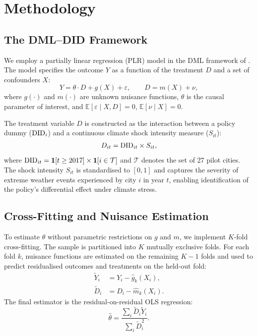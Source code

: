 \section{Methodology}
\label{sec:methodology}

\subsection{The DML--DID Framework}

We employ a partially linear regression (PLR) model in the DML
framework of \citet{chernozhukov2022automatic}. The model
specifies the outcome $Y$ as a function of the treatment $D$ and a
set of confounders $X$:
\begin{equation}
\label{eq:plr}
Y = \theta \cdot D + g(X) + \varepsilon, \qquad
D = m(X) + \nu,
\end{equation}
where $g(\cdot)$ and $m(\cdot)$ are unknown nuisance functions,
$\theta$ is the causal parameter of interest, and
$\mathbb{E}[\varepsilon \mid X, D] = 0$,
$\mathbb{E}[\nu \mid X] = 0$.

The treatment variable $D$ is constructed as the interaction between
a policy dummy ($\mathrm{DID}_i$) and a continuous climate shock intensity
measure ($S_{it}$):
\begin{equation}
\label{eq:treatment}
D_{it} = \mathrm{DID}_{it} \times S_{it},
\end{equation}
where $\mathrm{DID}_{it} = \mathbf{1}[t \geq 2017] \times \mathbf{1}[i \in
\mathcal{T}]$ and $\mathcal{T}$ denotes the set of 27 pilot cities.
The shock intensity $S_{it}$ is standardised to $[0, 1]$ and captures
the severity of extreme weather events experienced by city $i$ in
year $t$, enabling identification of the policy's differential effect
under climate stress.

\subsection{Cross-Fitting and Nuisance Estimation}

To estimate $\theta$ without parametric restrictions on $g$ and $m$,
we implement $K$-fold cross-fitting. The sample is partitioned into
$K$ mutually exclusive folds. For each fold $k$, nuisance functions
are estimated on the remaining $K-1$ folds and used to predict
residualised outcomes and treatments on the held-out fold:
\begin{align}
\tilde{Y}_i &= Y_i - \hat{g}_k(X_i), \\
\tilde{D}_i &= D_i - \hat{m}_k(X_i).
\end{align}
The final estimator is the residual-on-residual OLS regression:
\begin{equation}
\label{eq:dml_estimator}
\hat{\theta} = \frac{\sum_i \tilde{D}_i \tilde{Y}_i}
                    {\sum_i \tilde{D}_i^2}.
\end{equation}

